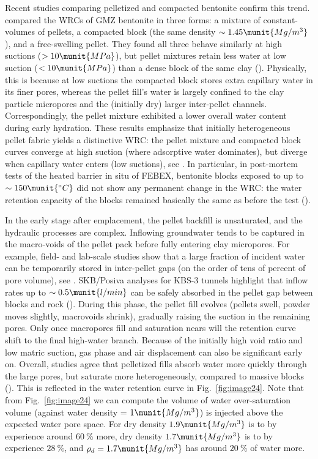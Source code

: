 Recent studies comparing pelletized and compacted bentonite confirm this trend. \cite{Liu2021} compared the WRCs of GMZ bentonite in three forms: a mixture of constant-volumes of pellets, a compacted block (the same density $\sim 1.45 \munit{Mg/m^3}$), and a free-swelling pellet. They found all three behave similarly at high suctions ($>10 \munit{MPa}$), but pellet mixtures retain less water at low suction ($<10 \munit{MPa}$) than a dense block of the same clay (\cite{Liu}). Physically, this is because at low suctions the compacted block stores extra capillary water in its finer pores, whereas the pellet fill’s water is largely confined to the clay particle micropores and the (initially dry) larger inter-pellet channels. Correspondingly, the pellet mixture exhibited a lower overall water content during early hydration. These results emphasize that initially heterogeneous pellet fabric yields a distinctive WRC: the pellet mixture and compacted block curves converge at high suction (where adsorptive water dominates), but diverge when capillary water enters (low suctions), see \cite{Liu}. In particular, in post-mortem tests of the heated barrier in situ of FEBEX, bentonite blocks exposed to up to $\sim 150 \munit{{}^\circ C}$ did not show any permanent change in the WRC: the water retention capacity of the blocks remained basically the same as before the test (\cite{villar2021febex}).


In the early stage after emplacement, the pellet backfill is unsaturated, and the hydraulic processes are complex. Inflowing groundwater tends to be captured in the macro-voids of the pellet pack before fully entering clay micropores. For example, field- and lab-scale studies show that a large fraction of incident water can be temporarily stored in inter-pellet gaps (on the order of tens of percent of pore volume), see \cite{SKB2009}. SKB/Posiva analyses for KBS-3 tunnels highlight that inflow rates up to $\sim 0.5 \munit{l/min}$ can be safely absorbed in the pellet gap between blocks and rock (\cite{SKB2009}). During this phase, the pellet fill evolves (pellets swell, powder moves slightly, macrovoids shrink), gradually raising the suction in the remaining pores. Only once macropores fill and saturation nears will the retention curve shift to the final high-water branch. Because of the initially high void ratio and low matric suction, gas phase and air displacement can also be significant early on. Overall, studies agree that pelletized fills absorb water more quickly through the large pores, but saturate more heterogeneously, compared to massive blocks (\cite{SKB2009}). This is reflected in the water retention curve in Fig.~\ref{fig:image24}. Note that from Fig.~\ref{fig:image24} we can compute the volume of water over-saturation volume (against water density = $1 \munit{Mg/m^3}$) is injected above the expected water pore space. For dry density $1.9 \munit{Mg/m^3}$ is to by experience around $60~\%$ more,  dry density 
$1.7 \munit{Mg/m^3}$ is to by experience $28~\%$, and $\rho_d = 1.7 \munit{Mg/m^3}$ has around $20~\%$  of water more.

